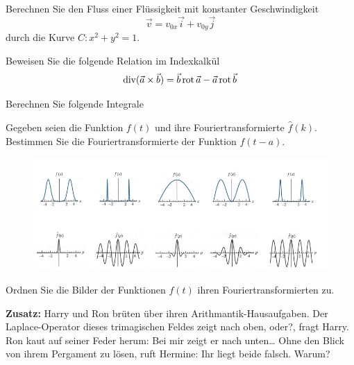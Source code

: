 \documentclass{atistandalonetask}
\begin{document}
\begin{atiTask}[
	title = Weitere Fragen
]
	\providecommand{\D}{\mathrm{d}}

\begin{atiSubtasks}
	\item Berechnen Sie den Fluss einer Flüssigkeit mit konstanter Geschwindigkeit 
	\[
	\vec{v}=v_{0x}\vec{i}+v_{0y}\vec{j}
	\]
	durch die Kurve $C: x^2+y^2=1$.
	\item Beweisen Sie die folgende Relation im Indexkalkül
	\[\operatorname{div}(\vec{a}\times\vec{b})=\vec{b}\operatorname{rot} \vec{a}-\vec{a}\operatorname{rot}\vec{b}
	\]
	\item Berechnen Sie folgende Integrale
	\begin{multicols}{2}
	\begin{atiSubequations}
		\item{}
		\item{}
	    \item{}
	    \item{}
	\end{atiSubequations}
	\end{multicols}
	\item Gegeben seien die Funktion $f(t)$ und ihre Fouriertransformierte $\hat{f}(k)$. Bestimmen Sie die Fouriertransformierte der Funktion $f(t-a)$.
	\begin{figure}[H]
\centering
\includegraphics[width=1\linewidth]{./picture-klausurss18}
\end{figure}

	\item Ordnen Sie die Bilder der Funktionen $f(t)$ ihren Fouriertransformierten zu.
	\item \textbf{Zusatz:} Harry und Ron brüten über ihren Arithmantik-Hausaufgaben. \glqq Der Laplace-Operator dieses trimagischen 
	Feldes zeigt nach oben, oder?\grqq{}, fragt Harry. Ron kaut auf seiner Feder herum: \glqq Bei mir zeigt er nach unten\dots\grqq{} Ohne den Blick von ihrem Pergament zu lösen, ruft Hermine: \glqq Ihr liegt beide falsch.\grqq{} Warum?
\end{atiSubtasks}

\end{atiTask}
\end{document}
